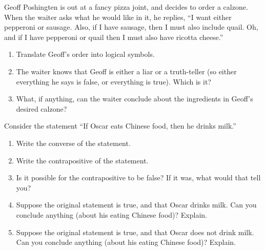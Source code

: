 \documentclass[10pt,]{book}
\theoremstyle{plain}
\theoremstyle{definition}
\theoremstyle{definition}
\theoremstyle{definition}
\theoremstyle{definition}
\numberwithin{equation}{chapter}
\begin{document}
\begin{divisionexercise}{3}\hypertarget{exercise-179}{}
\hypertarget{p-1377}{}%
Geoff Poshingten is out at a fancy pizza joint, and decides to order a calzone. When the waiter asks what he would like in it, he replies, ``I want either pepperoni or sausage. Also, if I have sausage, then I must also include quail. Oh, and if I have pepperoni or quail then I must also have ricotta cheese.''%
\leavevmode%
\begin{enumerate}[label=(\alph*)]
\item\hypertarget{li-349}{}\hypertarget{p-1378}{}%
Translate Geoff's order into logical symbols.%
\item\hypertarget{li-350}{}\hypertarget{p-1379}{}%
The waiter knows that Geoff is either a liar or a truth-teller (so either everything he says is false, or everything is true).  Which is it?%
\item\hypertarget{li-351}{}\hypertarget{p-1380}{}%
What, if anything, can the waiter conclude about the ingredients in Geoff's desired calzone?%
\end{enumerate}
\end{divisionexercise}%
\begin{divisionexercise}{4}\hypertarget{exercise-180}{}
\hypertarget{p-1381}{}%
Consider the statement ``If Oscar eats Chinese food, then he drinks milk.''%
\leavevmode%
\begin{enumerate}[label=(\alph*)]
\item\hypertarget{li-352}{}\hypertarget{p-1382}{}%
Write the converse of the statement.%
\item\hypertarget{li-353}{}\hypertarget{p-1383}{}%
Write the contrapositive of the statement.%
\item\hypertarget{li-354}{}\hypertarget{p-1384}{}%
Is it possible for the contrapositive to be false? If it was, what would that tell you?%
\item\hypertarget{li-355}{}\hypertarget{p-1385}{}%
Suppose the original statement is true, and that Oscar drinks milk. Can you conclude anything (about his eating Chinese food)? Explain.%
\item\hypertarget{li-356}{}\hypertarget{p-1386}{}%
Suppose the original statement is true, and that Oscar does not drink milk. Can you conclude anything (about his eating Chinese food)? Explain.%
\end{enumerate}
\end{divisionexercise}%
\end{document}
